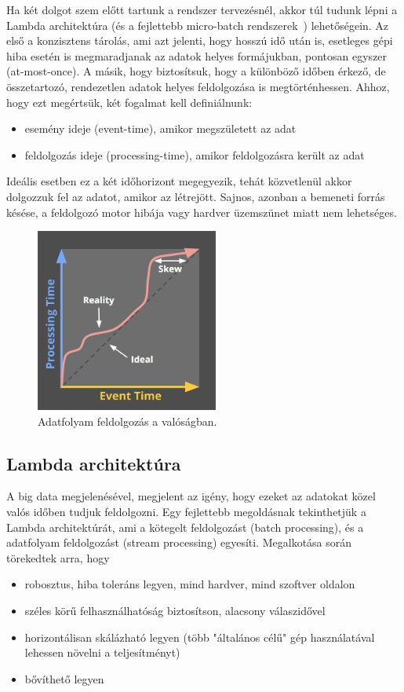 \documentclass[a4paper,12pt]{article}
\begin{document}
Ha két dolgot szem előtt tartunk a rendszer tervezésnél, akkor túl tudunk lépni a Lambda architektúra (és a fejlettebb micro-batch rendszerek~\cite{microbatch}) lehetőségein. Az első a konzisztens tárolás, ami azt jelenti, hogy hosszú idő után is, esetleges gépi hiba esetén is megmaradjanak az adatok helyes formájukban, pontosan egyszer (at-most-once). A másik, hogy biztosítsuk, hogy a különböző időben érkező, de összetartozó, rendezetlen adatok helyes feldolgozása is megtörténhessen. Ahhoz, hogy ezt megértsük, két fogalmat kell definiálnunk:
\begin{itemize}
\item esemény ideje (event-time), amikor megszületett az adat
\item feldolgozás ideje (processing-time), amikor feldolgozásra került az adat
\end{itemize}
Ideális esetben ez a két időhorizont megegyezik, tehát közvetlenül akkor dolgozzuk fel az adatot, amikor az létrejött. Sajnos, azonban a bemeneti forrás késése, a feldolgozó motor hibája vagy hardver üzemszünet miatt nem lehetséges. 
 
\begin{figure}[ht!]
\centering
\includegraphics[width=60mm]{img/skew.jpg}
\caption{Adatfolyam feldolgozás a valóságban. \label{skew}}
\end{figure}

\subsection{Lambda architektúra}
A big data megjelenésével, megjelent az igény, hogy ezeket az adatokat közel valós időben tudjuk feldolgozni. Egy fejlettebb megoldásnak tekinthetjük a Lambda architektúrát, ami a kötegelt feldolgozást (batch processing), és a adatfolyam feldolgozást (stream processing) egyesíti. Megalkotása során törekedtek arra, hogy 
\begin{itemize}
\item robosztus, hiba toleráns legyen, mind hardver, mind szoftver oldalon
\item széles körű felhasználhatóság biztosítson, alacsony válaszidővel
\item horizontálisan skálázható legyen (több "általános célű" gép használatával lehessen növelni a teljesítményt)
\item bővíthető legyen
\end{itemize}
\end{document}
